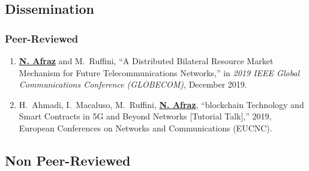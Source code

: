 

\subsection{Dissemination}
\subsubsection{Peer-Reviewed}

 \begin{enumerate}
   
    \item  \textbf{\underline{N. {Afraz}}} and M.~{Ruffini}, ``A Distributed Bilateral Resource Market Mechanism for Future Telecommunications Networks,'' in \emph{2019 IEEE Global Communications Conference (GLOBECOM)}, December 2019.

    \item H.~Ahmadi, I.~Macaluso, M.~{Ruffini}, \textbf{\underline{N. {Afraz}}}, ``blockchain Technology and Smart Contracts in \ac{5G} and Beyond Networks [Tutorial Talk],'' 2019, European Conferences on Networks and Communications (EUCNC).


 \end{enumerate}
 \subsection{Non Peer-Reviewed}
